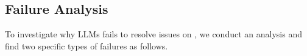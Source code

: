 

   

 

\subsection{Failure Analysis}
To investigate why LLMs fails to resolve issues on \Swebenchx, we conduct an analysis and find two specific types of failures as follows.


